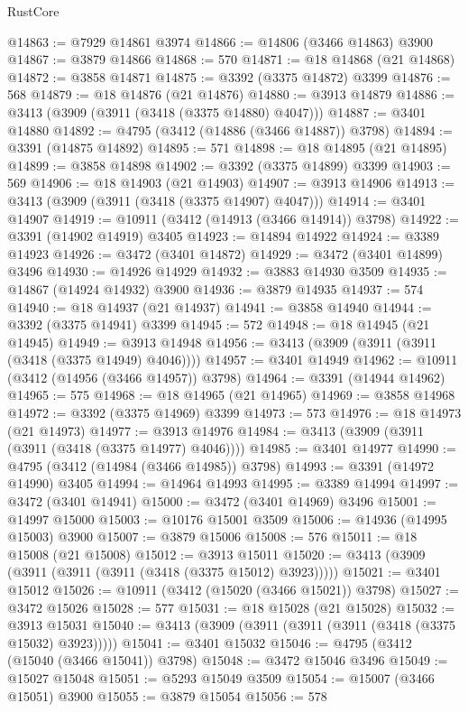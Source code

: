 \begin{lexlean}{RustCore}
\begin{coremodule}
@14863 := @7929 @14861 @3974
@14866 := @14806 (@3466 @14863) @3900
@14867 := @3879 @14866
@14868 := 570
@14871 := @18 @14868 (@21 @14868)
@14872 := @3858 @14871
@14875 := @3392 (@3375 @14872) @3399
@14876 := 568
@14879 := @18 @14876 (@21 @14876)
@14880 := @3913 @14879
@14886 := @3413 (@3909 (@3911 (@3418 (@3375 @14880) @4047)))
@14887 := @3401 @14880
@14892 := @4795 (@3412 (@14886 (@3466 @14887)) @3798)
@14894 := @3391 (@14875 @14892)
@14895 := 571
@14898 := @18 @14895 (@21 @14895)
@14899 := @3858 @14898
@14902 := @3392 (@3375 @14899) @3399
@14903 := 569
@14906 := @18 @14903 (@21 @14903)
@14907 := @3913 @14906
@14913 := @3413 (@3909 (@3911 (@3418 (@3375 @14907) @4047)))
@14914 := @3401 @14907
@14919 := @10911 (@3412 (@14913 (@3466 @14914)) @3798)
@14922 := @3391 (@14902 @14919) @3405
@14923 := @14894 @14922
@14924 := @3389 @14923
@14926 := @3472 (@3401 @14872)
@14929 := @3472 (@3401 @14899) @3496
@14930 := @14926 @14929
@14932 := @3883 @14930 @3509
@14935 := @14867 (@14924 @14932) @3900
@14936 := @3879 @14935
@14937 := 574
@14940 := @18 @14937 (@21 @14937)
@14941 := @3858 @14940
@14944 := @3392 (@3375 @14941) @3399
@14945 := 572
@14948 := @18 @14945 (@21 @14945)
@14949 := @3913 @14948
@14956 := @3413 (@3909 (@3911 (@3911 (@3418 (@3375 @14949) @4046))))
@14957 := @3401 @14949
@14962 := @10911 (@3412 (@14956 (@3466 @14957)) @3798)
@14964 := @3391 (@14944 @14962)
@14965 := 575
@14968 := @18 @14965 (@21 @14965)
@14969 := @3858 @14968
@14972 := @3392 (@3375 @14969) @3399
@14973 := 573
@14976 := @18 @14973 (@21 @14973)
@14977 := @3913 @14976
@14984 := @3413 (@3909 (@3911 (@3911 (@3418 (@3375 @14977) @4046))))
@14985 := @3401 @14977
@14990 := @4795 (@3412 (@14984 (@3466 @14985)) @3798)
@14993 := @3391 (@14972 @14990) @3405
@14994 := @14964 @14993
@14995 := @3389 @14994
@14997 := @3472 (@3401 @14941)
@15000 := @3472 (@3401 @14969) @3496
@15001 := @14997 @15000
@15003 := @10176 @15001 @3509
@15006 := @14936 (@14995 @15003) @3900
@15007 := @3879 @15006
@15008 := 576
@15011 := @18 @15008 (@21 @15008)
@15012 := @3913 @15011
@15020 := @3413 (@3909 (@3911 (@3911 (@3911 (@3418 (@3375 @15012) @3923)))))
@15021 := @3401 @15012
@15026 := @10911 (@3412 (@15020 (@3466 @15021)) @3798)
@15027 := @3472 @15026
@15028 := 577
@15031 := @18 @15028 (@21 @15028)
@15032 := @3913 @15031
@15040 := @3413 (@3909 (@3911 (@3911 (@3911 (@3418 (@3375 @15032) @3923)))))
@15041 := @3401 @15032
@15046 := @4795 (@3412 (@15040 (@3466 @15041)) @3798)
@15048 := @3472 @15046 @3496
@15049 := @15027 @15048
@15051 := @5293 @15049 @3509
@15054 := @15007 (@3466 @15051) @3900
@15055 := @3879 @15054
@15056 := 578

\end{coremodule}
\end{lexlean}
